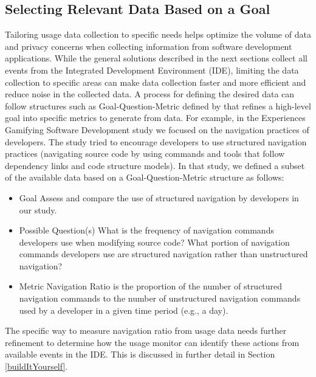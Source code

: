 \subsection{Selecting Relevant Data Based on a Goal}
\label{SelectingData}
Tailoring usage data collection to specific needs helps optimize the volume of data and privacy concerns when collecting information from software development applications.  While the general solutions described in the next sections collect all events from the Integrated Development Environment (IDE), limiting the data collection to specific areas can make data collection faster and more efficient and reduce noise in the collected data.  A process for defining the desired data can follow structures such as Goal-Question-Metric defined by \citet{basili-GQM}  that refines a high-level goal into specific metrics to generate from data.  For example, in the Experiences Gamifying Software Development \citep{SnipesExperiencesGamifyingSoftwareDevelopment} study we focused on the navigation practices of developers.  The study tried to encourage developers to use structured navigation practices (navigating source code by using commands and tools that follow dependency links and code structure models).  In that study, we defined a subset of the available data based on a Goal-Question-Metric structure as follows:
    \begin{itemize}
\item
	Goal
\subitem
	Assess and compare the use of structured navigation by developers in our study.
\item
	Possible Question(s)
\subitem
	What is the frequency of navigation commands developers use when modifying source code?
\subitem
	What portion of navigation commands developers use are structured navigation rather than unstructured navigation?
\item
	Metric
\subitem
	Navigation Ratio is the proportion of the number of structured navigation commands to the number of unstructured navigation commands used by a developer in a given time period (e.g., a day).

	    \end{itemize}

The specific way to measure navigation ratio from usage data needs further refinement to determine how the usage monitor can identify these actions from available events in the IDE. This is discussed in further detail in Section \ref{buildItYourself}.

